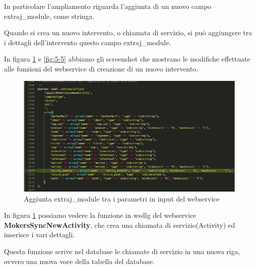 \begin{flushleft}
	In particolare l'ampliamento riguarda l'aggiunta di un nuovo campo extraj\_module, come  stringa.
	
	Quando si crea un nuovo intervento, o chiamata di servizio, si può aggiungere tra i dettagli dell'intervento questo campo extraj\_module.
	
	In figura \ref{fig:5-4} e \ref{fig:5-5} abbiamo gli screenshot che mostrano le modifiche effettuate alle funzioni del webservice di creazione di un nuovo intervento.
\end{flushleft}
\newspace
\begin{figure}[!h] 
	\centering
	\includegraphics[scale = 0.4]{immagini/webservices/ampliamenti/2ampl_prototipo_types.png}
	\caption{Aggiunta extraj\_module tra i parametri in input del webservice}
	\label{fig:5-4}
\end{figure}
\newspace
\begin{flushleft}
	In figura \ref{fig:5-4} possiamo vedere la funzione in \gls{wsdlg} del webservice \textbf{MokersSyncNewActivity}, che crea una chiamata di servizio(Activity) ed inserisce i vari dettagli. 
	
	Questa funzione scrive nel database le chiamate di servizio in una nuova riga, ovvero una nuova voce della tabella del database.
\end{flushleft}

\newpage

